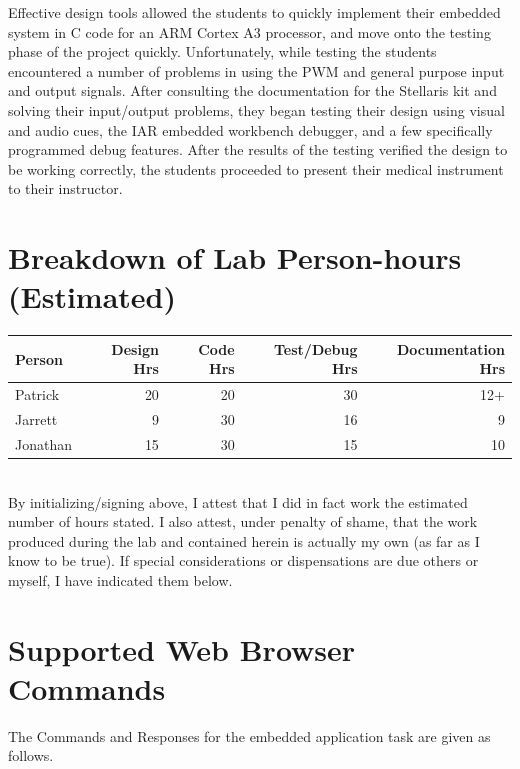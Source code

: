 \documentclass[12pt]{article} %
\begin{document}
    Effective design tools allowed the students to quickly implement their embedded
    system in C code for an ARM Cortex A3 processor, and move onto the testing
    phase of the project quickly. Unfortunately, while testing the students
    encountered a number of problems in using the PWM and general purpose input and
    output signals. After consulting the documentation for the Stellaris kit and
    solving their input/output problems, they began testing their design using
    visual and audio cues, the IAR embedded workbench debugger, and a few
    specifically programmed debug features. After the results of the testing
    verified the design to be working correctly, the students proceeded to present
    their medical instrument to their instructor.

    \pagebreak
    \appendix

    \section{Breakdown of Lab Person-hours (Estimated)}

    \begin{tabular}{|l|*{4}{r|}}
      \hline
      Person & Design Hrs & Code Hrs & Test/Debug Hrs & Documentation Hrs \\ \hline
      Patrick & 20 & 20 & 30 & 12+  \\ \hline
			Jarrett & 9 & 30 & 16 & 9 \\ \hline
      Jonathan & 15 & 30 & 15 & 10  \\ \hline
    \end{tabular}

    ~\\

    By initializing/signing above, I attest that I did in fact work the
    estimated number of hours stated. I also attest, under penalty of shame,
    that the work produced during the lab and contained herein is actually my
    own (as far as I know to be true). If special considerations or
    dispensations are due others or myself, I have indicated them below.

    \pagebreak

		\section{Supported Web Browser Commands}
        \label{appendix:commands}

		The Commands and Responses for the embedded application task are given as follows. 
\end{document}
